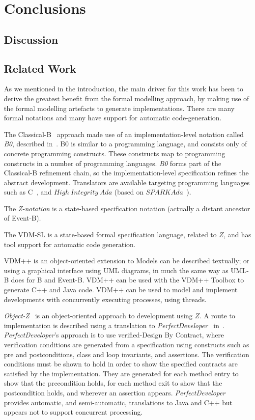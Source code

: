 \section{Conclusions}
\subsection{Discussion}

\subsection{Related Work}
As we mentioned in the introduction, the main driver for this work has been to derive the greatest benefit from the formal modelling approach, by making use of the formal modelling artefacts to generate implementations. There are many formal notations and many have support for automatic code-generation.

The Classical-B~\cite{TheBBook} approach made use of an implementation-level notation called \emph{B0}, described in~\cite{B0RefMan}. B0 is similar to a programming language, and consists only of concrete programming constructs. These constructs map to programming constructs in a number of programming languages. \emph{B0} forms part of the Classical-B refinement chain, so the implementation-level specification refines the abstract development. Translators are available targeting programming languages such as C~\cite{KernighanR88}, and $High~ Integrity~ Ada$ (based on $SPARKAda$~\cite{SPARKAda}). 

The \emph{Z-notation} is a state-based specification notation (actually a distant ancestor of Event-B).  

The VDM-SL is a state-based formal specification language, related to $Z$, and has tool support for automatic code generation. 

VDM++ is an object-oriented extension to Models can be described textually; or using a graphical interface using UML diagrams, in much the same way as UML-B does for B and Event-B. VDM++ can be used with the VDM++ Toolbox to generate C++ and Java code. VDM++ can be used to model and implement developments with concurrently executing processes, using threads.

\emph{Object-Z}~\cite{GSmith2000} is an object-oriented approach to development using $Z$. A route to implementation is described using a translation to \emph{PerfectDeveloper}~\cite{PD} in~\cite{Stevens06}. \emph{PerfectDeveloper}'s approach is to use verified-Design By Contract, where verification conditions are generated from a specification using constructs such as pre and postconditions, class and loop invariants, and assertions. The verification conditions must be shown to hold in order to show the specified contracts are satisfied by the implementation. They are generated for each method entry to show that the precondition holds, for each method exit to show that the postcondition holds, and wherever an assertion appears. \emph{PerfectDeveloper} provides automatic, and semi-automatic, translations to Java and C++ but appears not to support concurrent processing.

